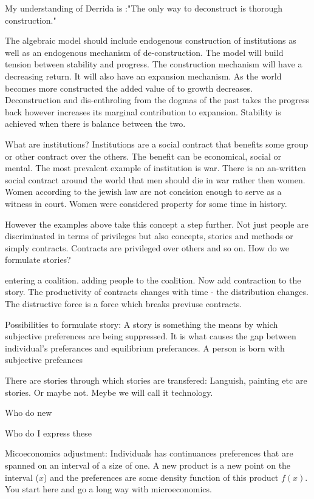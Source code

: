 \documentclass[14pt,oneside]{amsart}
\begin{document}
My understanding of Derrida is :"The only way to deconstruct is thorough construction." 

The algebraic model should include endogenous construction of institutions as well as an endogenous mechanism of de-construction. The model will build tension between stability and progress. The construction mechanism will have a decreasing return. It will also have an expansion mechanism. As the world becomes more constructed the added value of to growth decreases. Deconstruction and dis-enthroling from the dogmas of the past takes the progress back however increases its marginal contribution to expansion. Stability is achieved when there is balance between the two. 


What are institutions?
Institutions are a social contract that benefits some group or other contract over the others. The benefit can be economical, social or mental. The most prevalent example of institution is war. There is an an-written social contract around the world that men should die in war rather then women. Women according to the jewish law are not concision enough to serve as a witness in court. Women were considered property for some time in history. 

However the examples above take this concept a step further. Not just people are discriminated in terms of privileges but also concepts, stories and methods or simply contracts. Contracts are privileged over others and so on. How do we formulate stories? 

entering a coalition.
adding people to the coalition.
Now add contraction to the story.
The productivity of contracts changes with time - the distribution changes.
The distructive force is a force which breaks previuse contracts.


Possibilities to formulate story:
A story is something the means by which subjective preferences are being suppressed. It is what causes the gap between individual's preferances and equilibrium preferances. A person is born with subjective prefeances 
 
There are stories through which stories are transfered: Languish, painting etc are stories. Or maybe not. Meybe we will call it technology.

Who do new 


Who do I express these 


Micoeconomics adjustment: Individuals has continuances preferences that are spanned on an interval of a size of one. A new product is a new point on the interval ($x$) and the preferences are some density function of this product $f(x)$. You start here and go a long way with microeconomics.
\end{document}
